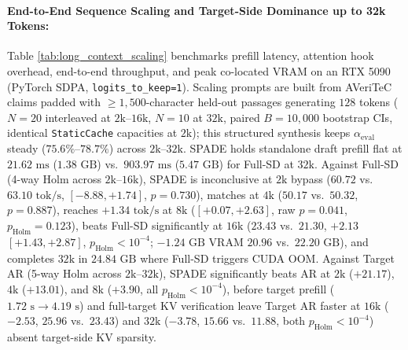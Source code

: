 \documentclass[11pt]{article}
\begin{document}
\paragraph{End-to-End Sequence Scaling and Target-Side Dominance up to 32k Tokens:}
Table \ref{tab:long_context_scaling} benchmarks prefill latency, attention hook overhead, end-to-end throughput, and peak co-located VRAM on an RTX 5090 (PyTorch SDPA, \texttt{logits\_to\_keep=1}). Scaling prompts are built from AVeriTeC claims padded with $\ge 1,500$-character held-out passages generating $128$ tokens ($N=20$ interleaved at $2\text{k}$--$16\text{k}$, $N=10$ at $32\text{k}$, paired $B=10,000$ bootstrap CIs, identical \texttt{StaticCache} capacities at $2\text{k}$); this structured synthesis keeps $\alpha_{\text{eval}}$ steady ($75.6\%\text{--}78.7\%$) across $2\text{k}$--$32\text{k}$. SPADE holds standalone draft prefill flat at $21.62\text{ ms}$ ($1.38\text{ GB}$) vs.\ $903.97\text{ ms}$ ($5.47\text{ GB}$) for Full-SD at $32\text{k}$. Against Full-SD (4-way Holm across $2\text{k}$--$16\text{k}$), SPADE is inconclusive at $2\text{k}$ bypass ($60.72$ vs.\ $63.10\text{ tok/s}$, $[-8.88, +1.74]$, $p=0.730$), matches at $4\text{k}$ ($50.17$ vs.\ $50.32$, $p=0.887$), reaches $+1.34\text{ tok/s}$ at $8\text{k}$ ($[+0.07, +2.63]$, raw $p=0.041$, $p_{\text{Holm}}=0.123$), beats Full-SD significantly at $16\text{k}$ ($23.43$ vs.\ $21.30$, $+2.13$ $[+1.43, +2.87]$, $p_{\text{Holm}}<10^{-4}$; $-1.24\text{ GB}$ VRAM $20.96$ vs.\ $22.20\text{ GB}$), and completes $32\text{k}$ in $24.84\text{ GB}$ where Full-SD triggers CUDA OOM. Against Target AR (5-way Holm across $2\text{k}$--$32\text{k}$), SPADE significantly beats AR at $2\text{k}$ ($+21.17$), $4\text{k}$ ($+13.01$), and $8\text{k}$ ($+3.90$, all $p_{\text{Holm}}<10^{-4}$), before target prefill ($1.72\text{ s} \to 4.19\text{ s}$) and full-target KV verification leave Target AR faster at $16\text{k}$ ($-2.53$, $25.96$ vs.\ $23.43$) and $32\text{k}$ ($-3.78$, $15.66$ vs.\ $11.88$, both $p_{\text{Holm}}<10^{-4}$) absent target-side KV sparsity.
\end{document}
